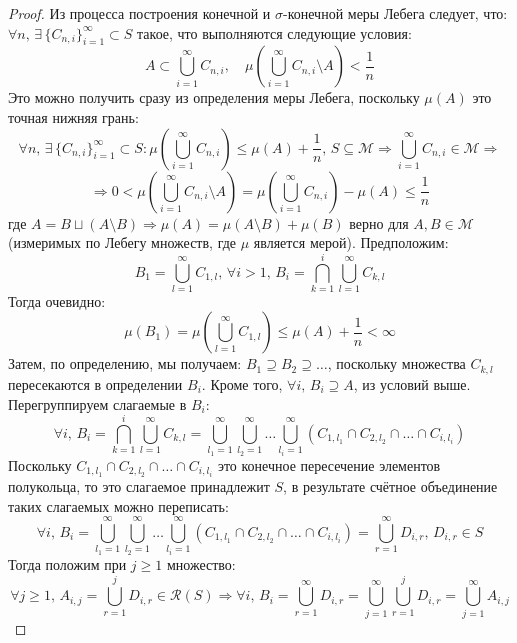 \documentclass[12pt]{article}
\newcommand{\MCR}{\mathcal{R}}
\newcommand{\MM}{\mathcal{M}}
\theoremstyle{definition}
\begin{document}
\begin{proof}
	Из процесса построения конечной и $\sigma$-конечной меры Лебега следует, что: $\forall n, \, \exists \, \{C_{n,i}\}_{i=1}^{\infty} \subset S$ такое, что выполняются следующие условия: 
	$$
		A \subset \bigcup\limits_{i = 1}^{\infty}C_{n,i}, \quad \mu\left(\bigcup\limits_{i = 1}^{\infty}C_{n,i} \setminus A\right) < \dfrac{1}{n}
	$$ 
	Это можно получить сразу из определения меры Лебега, поскольку $\mu(A)$ это точная нижняя грань: 
	$$
		\forall n, \, \exists \, \{C_{n,i}\}_{i=1}^{\infty} \subset S \colon \mu\left(\bigcup\limits_{i = 1}^{\infty}C_{n,i} \right) \leq \mu(A) + \dfrac{1}{n}, \, S \subseteq \MM \Rightarrow  \bigcup\limits_{i = 1}^{\infty}C_{n,i} \in \MM \Rightarrow
	$$
	$$
		\Rightarrow 0 < \mu\left(\bigcup\limits_{i = 1}^{\infty}C_{n,i} \setminus A\right) = \mu\left(\bigcup\limits_{i = 1}^{\infty}C_{n,i} \right) - \mu(A) \leq \dfrac{1}{n}
	$$
	где $A = B \sqcup (A \setminus B) \Rightarrow \mu(A) = \mu(A \setminus B) + \mu(B)$ верно для $A,B \in \MM$ (измеримых по Лебегу множеств, где $\mu$ является мерой). Предположим: 
	$$
		B_1 = \bigcup\limits_{l = 1}^{\infty}C_{1,l}, \, \forall i > 1, \, B_i = \bigcap\limits_{k = 1}^{i}\bigcup\limits_{l = 1}^{\infty}C_{k,l}
	$$ 
	Тогда очевидно:
	$$
		\mu(B_1) = \mu\left(\bigcup\limits_{l = 1}^{\infty}C_{1,l}\right) \leq \mu(A) + \dfrac{1}{n} < \infty
	$$
	Затем, по определению, мы получаем: $B_1 \supseteq B_2 \supseteq \dotsc$, поскольку множества $C_{k,l}$ пересекаются в определении $B_i$. Кроме того, $\forall i, \, B_i \supseteq A$, из условий выше. Перегруппируем слагаемые в $B_i$:
	$$
		\forall i, \, B_i = \bigcap\limits_{k = 1}^{i}\bigcup\limits_{l = 1}^{\infty}C_{k,l} =  \bigcup\limits_{l_1 = 1}^{\infty}\bigcup\limits_{l_2 = 1}^{\infty}\dotsc\bigcup\limits_{l_i = 1}^{\infty}(C_{1,l_1}\cap C_{2,l_2} \cap \dotsc \cap C_{i,l_i})
	$$
	Поскольку $C_{1,l_1}\cap C_{2,l_2} \cap \dotsc \cap C_{i,l_i}$ это конечное пересечение элементов полукольца, то это слагаемое принадлежит $S$, в результате счётное объединение таких слагаемых можно переписать:
	$$
		\forall i, \, B_i = \bigcup\limits_{l_1 = 1}^{\infty}\bigcup\limits_{l_2 = 1}^{\infty}\dotsc\bigcup\limits_{l_i = 1}^{\infty}(C_{1,l_1}\cap C_{2,l_2} \cap \dotsc \cap C_{i,l_i}) = \bigcup\limits_{r = 1}^{\infty}D_{i,r}, \, D_{i,r} \in S
	$$
	Тогда положим при $j \geq 1$ множество: 
	$$
		\forall j \geq 1, \, A_{i,j} = \bigcup\limits_{r = 1}^{j}D_{i,r} \in \MCR(S) \Rightarrow \forall i, \, B_i = \bigcup\limits_{r = 1}^{\infty}D_{i,r} = \bigcup\limits_{j = 1}^{\infty}\bigcup\limits_{r = 1}^{j}D_{i,r} = \bigcup\limits_{j = 1}^{\infty}A_{i,j}
$$
\end{proof}
\end{document}
